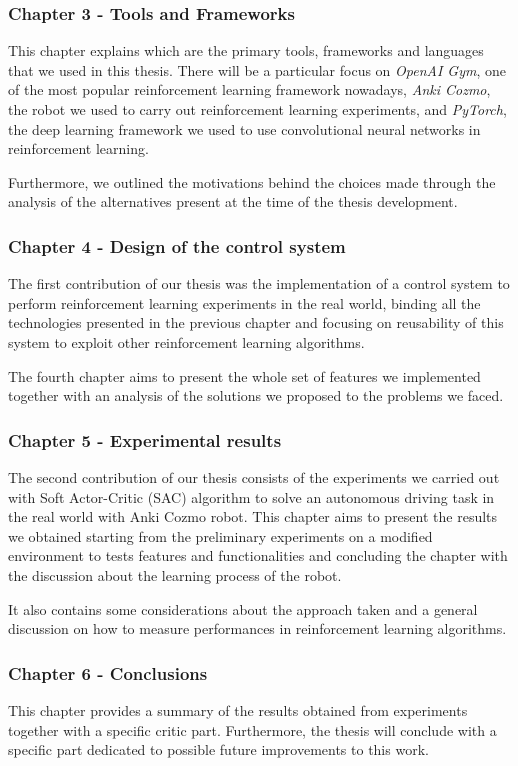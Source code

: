 \subsubsection*{Chapter 3 - Tools and Frameworks} 

This chapter explains which are the primary tools, frameworks and languages that we used in this thesis.
There will be a particular focus on \textit{OpenAI Gym}, one of the most popular reinforcement learning framework nowadays, \textit{Anki Cozmo}, the robot we used to carry out reinforcement learning experiments, and \textit{PyTorch}, the deep learning framework we used to use convolutional neural networks in reinforcement learning.

Furthermore, we outlined the motivations behind the choices made through the analysis of the alternatives present at the time of the thesis development.

\subsubsection*{Chapter 4 - Design of the control system}

The first contribution of our thesis was the implementation of a control system to perform reinforcement learning experiments in the real world, binding all the technologies presented in the previous chapter and focusing on reusability of this system to exploit other reinforcement learning algorithms.

The fourth chapter aims to present the whole set of features we implemented together with an analysis of the solutions we proposed to the problems we faced.

\subsubsection*{Chapter 5 - Experimental results} 

The second contribution of our thesis consists of the experiments we carried out with Soft Actor-Critic (SAC) algorithm to solve an autonomous driving task in the real world with Anki Cozmo robot.
This chapter aims to present the results we obtained starting from the preliminary experiments on a modified environment to tests features and functionalities and concluding the chapter with the discussion about the learning process of the robot.

It also contains some considerations about the approach taken and a general discussion on how to measure performances in reinforcement learning algorithms.

\subsubsection*{Chapter 6 - Conclusions} 

This chapter provides a summary of the results obtained from experiments together with a specific critic part.
Furthermore, the thesis will conclude with a specific part dedicated to possible future improvements to this work.